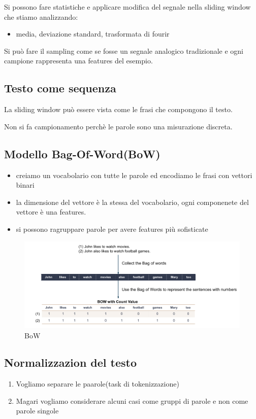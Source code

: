 Si possono fare statistiche e applicare modifica del segnale nella sliding window che stiamo
analizzando:
\begin{itemize}
    \item media, deviazione standard, trasformata di fourir
\end{itemize}

Si può fare il sampling come se fosse un segnale analogico tradizionale
e ogni campione rappresenta una features del esempio.

\subsection{Testo come sequenza}
La sliding window può essere vista come le frasi che compongono il testo.

Non si fa campionamento perchè le parole sono una misurazione discreta.

\subsection{Modello Bag-Of-Word(BoW)}
\begin{itemize}
    \item creiamo un vocabolario con tutte le parole ed encodiamo le frasi con vettori
    binari
    \item la dimensione del vettore è la stessa del vocabolario, ogni componenete del vettore
    è una features.
    \item si possono ragruppare parole per avere features più sofisticate
\end{itemize}

\begin{figure}[H]
    \centering
    \includegraphics[width=0.7\linewidth]{imgs/bow}
    \caption{BoW}
    \label{fig:BoW}
\end{figure}


\subsection{Normalizzazion del testo}
\begin{enumerate}
    \item Vogliamo separare le paarole(task di tokenizzazione)
    \item Magari vogliamo considerare alcuni casi come gruppi di parole e non
    come parole singole
\end{enumerate}

